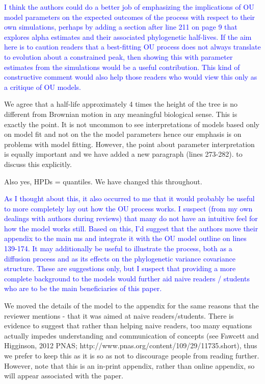 \documentclass[12pt]{letter}
\begin{document}
\begin{letter}{}
\textcolor{blue}{I think the authors could do a better job of emphasizing the implications of OU model parameters on the expected outcomes of the process with respect to their own simulations, perhaps by adding a section after line 211 on page 9 that explores alpha estimates and their associated phylogenetic half-lives. If the aim here is to caution readers that a best-fitting OU process does not always translate to evolution about a constrained peak, then showing this with parameter estimates from the simulations would be a useful contribution. This kind of constructive comment would also help those readers who would view this only as a critique of OU models.}

We agree that a half-life approximately 4 times the height of the tree is no different from Brownian motion in any meaningful biological sense. This is exactly the point. It is not uncommon to see interpretations of models based only on model fit and not on the the model parameters hence our emphasis is on problems with model fitting. However, the point about parameter interpretation is equally important and we have added a new paragraph (lines 273-282).
to discuss this explicitly. 

Also yes, HPDs = quantiles. We have changed this throughout.

\textcolor{blue}{As I thought about this, it also occurred to me that it would probably be useful to more completely lay out how the OU process works. I suspect (from my own dealings with authors during reviews) that many do not have an intuitive feel for how the model works still. Based on this, I'd suggest that the authors move their appendix to the main ms and integrate it with the OU model outline on lines 139-174. It may additionally be useful to illustrate the process, both as a diffusion process and as its effects on the phylogenetic variance covariance structure. These are suggestions only, but I suspect that providing a more complete background to the models would further aid naive readers / students who are to be the main beneficiaries of this paper.}

We moved the details of the model to the appendix for the same reasons that the reviewer mentions - that it was aimed at naive readers/students. There is evidence to suggest that rather than helping naive readers, too many equations actually impedes understanding and communication of concepts (see Fawcett and Higginson, 2012 PNAS; http://www.pnas.org/content/109/29/11735.short), thus we prefer to keep this as it is so as not to discourage people from reading further. However, note that this is an in-print appendix, rather than online appendix, so will appear associated with the paper.


\end{letter}
\end{document}
